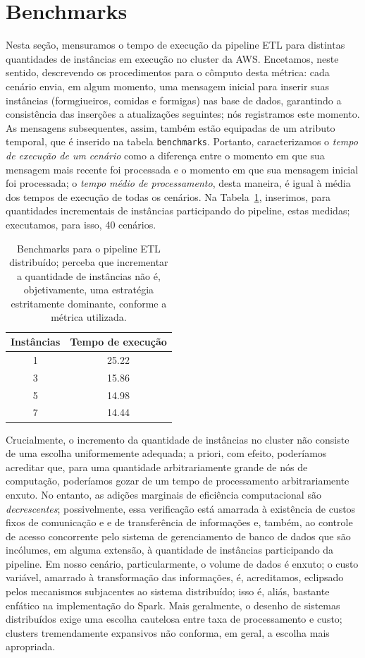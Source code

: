 \documentclass[12pt,oneside,a4paper]{article}
\begin{document}
\appendix 

\section{Benchmarks} 

Nesta seção, mensuramos o tempo de execução da pipeline ETL para distintas quantidades de instâncias em execução no cluster da AWS. Encetamos, neste sentido, descrevendo os procedimentos para o cômputo desta métrica: cada cenário envia, em algum momento, uma mensagem inicial para inserir suas instâncias (formgiueiros, comidas e formigas) nas base de dados, garantindo a consistência das inserções a atualizações seguintes; nós registramos este momento. As mensagens subsequentes, assim, também estão equipadas de um atributo temporal, que é inserido na tabela \texttt{benchmarks}. Portanto, caracterizamos o \textit{tempo de execução de um cenário} como a diferença entre o momento em que sua mensagem mais recente foi processada e o momento em que sua mensagem inicial foi processada; o \textit{tempo médio de processamento}, desta maneira, é igual à média dos tempos de execução de todas os cenários. Na Tabela~\ref{tab:benchmarks}, inserimos, para quantidades incrementais de instâncias participando do pipeline, estas medidas; executamos, para isso, 40 cenários.     

\begin{table} 
	\centering 
	\begin{tabular}{c | c} 
		Instâncias & Tempo de execução \\
		\hline 
		1 & 25.22 \\ 
		3 & 15.86 \\ 
		5 & 14.98 \\ 
		7 & 14.44 \\ 
		\hline 
	\end{tabular}
	\caption{Benchmarks para o pipeline ETL distribuído; perceba que incrementar a quantidade de instâncias não é, objetivamente, uma estratégia estritamente dominante, conforme a métrica utilizada.} 
	\label{tab:benchmarks} 
\end{table} 

Crucialmente, o incremento da quantidade de instâncias no cluster não consiste de uma escolha uniformemente adequada; a priori, com efeito, poderíamos acreditar que, para uma quantidade arbitrariamente grande de nós de computação, poderíamos gozar de um tempo de processamento arbitrariamente enxuto. No entanto, as adições marginais de eficiência computacional são \textit{decrescentes}; possivelmente, essa verificação está amarrada à existência de custos fixos de comunicação e e de transferência de informações e, também, ao controle de acesso concorrente pelo sistema de gerenciamento de banco de dados que são incólumes, em alguma extensão, à quantidade de instâncias participando da pipeline. Em nosso cenário, particularmente, o volume de dados é enxuto; o custo variável, amarrado à transformação das informações, é, acreditamos, eclipsado pelos mecanismos subjacentes ao sistema distribuído; isso é, aliás, bastante enfático na implementação do Spark. Mais geralmente, o desenho de sistemas distribuídos exige uma escolha cautelosa entre taxa de processamento e custo; clusters tremendamente expansivos não conforma, em geral, a escolha mais apropriada. 
\end{document}
